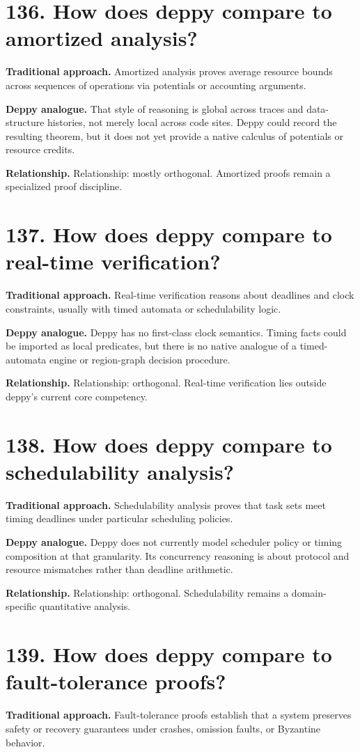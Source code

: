 \documentclass[11pt,openany]{book}
\begin{document}
\section*{136. How does deppy compare to amortized analysis?}
\textbf{Traditional approach.} Amortized analysis proves average resource bounds across sequences of operations via potentials or accounting arguments.

\textbf{Deppy analogue.} That style of reasoning is global across traces and data-structure histories, not merely local across code sites. Deppy could record the resulting theorem, but it does not yet provide a native calculus of potentials or resource credits.

\textbf{Relationship.} Relationship: mostly orthogonal. Amortized proofs remain a specialized proof discipline.

\section*{137. How does deppy compare to real-time verification?}
\textbf{Traditional approach.} Real-time verification reasons about deadlines and clock constraints, usually with timed automata or schedulability logic.

\textbf{Deppy analogue.} Deppy has no first-class clock semantics. Timing facts could be imported as local predicates, but there is no native analogue of a timed-automata engine or region-graph decision procedure.

\textbf{Relationship.} Relationship: orthogonal. Real-time verification lies outside deppy's current core competency.

\section*{138. How does deppy compare to schedulability analysis?}
\textbf{Traditional approach.} Schedulability analysis proves that task sets meet timing deadlines under particular scheduling policies.

\textbf{Deppy analogue.} Deppy does not currently model scheduler policy or timing composition at that granularity. Its concurrency reasoning is about protocol and resource mismatches rather than deadline arithmetic.

\textbf{Relationship.} Relationship: orthogonal. Schedulability remains a domain-specific quantitative analysis.

\section*{139. How does deppy compare to fault-tolerance proofs?}
\textbf{Traditional approach.} Fault-tolerance proofs establish that a system preserves safety or recovery guarantees under crashes, omission faults, or Byzantine behavior.
\end{document}

